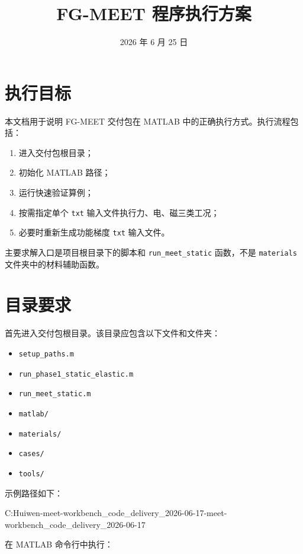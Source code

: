 \documentclass[UTF8,fontset=windows]{ctexart}
\title{FG-MEET 程序执行方案}
\author{}
\date{2026 年 6 月 25 日}
\begin{document}
\maketitle

\section{执行目标}

本文档用于说明 FG-MEET 交付包在 MATLAB 中的正确执行方式。执行流程包括：

\begin{enumerate}
  \item 进入交付包根目录；
  \item 初始化 MATLAB 路径；
  \item 运行快速验证算例；
  \item 按需指定单个 \texttt{txt} 输入文件执行力、电、磁三类工况；
  \item 必要时重新生成功能梯度 \texttt{txt} 输入文件。
\end{enumerate}

主要求解入口是项目根目录下的脚本和 \texttt{run\_meet\_static} 函数，不是 \texttt{materials} 文件夹中的材料辅助函数。

\section{目录要求}

首先进入交付包根目录。该目录应包含以下文件和文件夹：

\begin{itemize}
  \item \texttt{setup\_paths.m}
  \item \texttt{run\_phase1\_static\_elastic.m}
  \item \texttt{run\_meet\_static.m}
  \item \texttt{matlab/}
  \item \texttt{materials/}
  \item \texttt{cases/}
  \item \texttt{tools/}
\end{itemize}

示例路径如下：

\begin{code}
C:\Users\You Huiwen\Desktop\fg-meet-workbench_code_delivery_2026-06-17\fg-meet-workbench_code_delivery_2026-06-17
\end{code}

在 MATLAB 命令行中执行：
\end{document}

